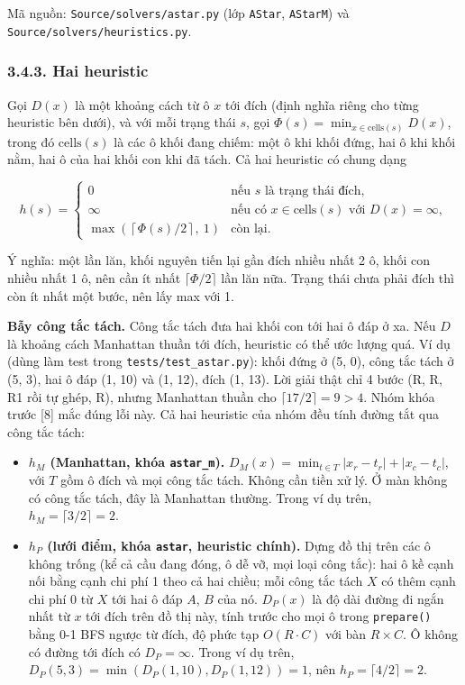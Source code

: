 Mã nguồn: \texttt{Source/\allowbreak{}solvers/\allowbreak{}astar.\allowbreak{}py} (lớp \texttt{AStar}, \texttt{AStarM}) và \texttt{Source/\allowbreak{}solvers/\allowbreak{}heuristics.\allowbreak{}py}.

\subsubsection{3.4.3. Hai heuristic}

Gọi \(D(x)\) là một khoảng cách từ ô \(x\) tới đích (định nghĩa riêng cho từng heuristic bên dưới), và với mỗi trạng thái \(s\), gọi \(\Phi(s) = \min_{x \in \text{cells}(s)} D(x)\), trong đó \(\text{cells}(s)\) là các ô khối đang chiếm: một ô khi khối đứng, hai ô khi khối nằm, hai ô của hai khối con khi đã tách. Cả hai heuristic có chung dạng

\[
h(s) = \begin{cases}
0 & \text{nếu } s \text{ là trạng thái đích,} \\
\infty & \text{nếu có } x \in \text{cells}(s) \text{ với } D(x) = \infty, \\
\max\left(\left\lceil \Phi(s)/2 \right\rceil,\ 1\right) & \text{còn lại.}
\end{cases}
\]

Ý nghĩa: một lần lăn, khối nguyên tiến lại gần đích nhiều nhất 2 ô, khối con nhiều nhất 1 ô, nên cần ít nhất \(\lceil \Phi/2 \rceil\) lần lăn nữa. Trạng thái chưa phải đích thì còn ít nhất một bước, nên lấy max với 1.

\textbf{Bẫy công tắc tách.} Công tắc tách đưa hai khối con tới hai ô đáp ở xa. Nếu \(D\) là khoảng cách Manhattan thuần tới đích, heuristic có thể ước lượng quá. Ví dụ (dùng làm test trong \texttt{tests/\allowbreak{}test\_\allowbreak{}astar.\allowbreak{}py}): khối đứng ở (5, 0), công tắc tách ở (5, 3), hai ô đáp (1, 10) và (1, 12), đích (1, 13). Lời giải thật chỉ 4 bước (R, R, R1 rồi tự ghép, R), nhưng Manhattan thuần cho \(\lceil 17/2 \rceil = 9 > 4\). Nhóm khóa trước {[}8{]} mắc đúng lỗi này. Cả hai heuristic của nhóm đều tính đường tắt qua công tắc tách:

\begin{itemize}
\tightlist
\item
  \textbf{\(h_M\) (Manhattan, khóa \texttt{astar\_\allowbreak{}m}).} \(D_M(x) = \min_{t \in T} |x_r - t_r| + |x_c - t_c|\), với \(T\) gồm ô đích và mọi công tắc tách. Không cần tiền xử lý. Ở màn không có công tắc tách, đây là Manhattan thường. Trong ví dụ trên, \(h_M = \lceil 3/2 \rceil = 2\).
\item
  \textbf{\(h_P\) (lưới điểm, khóa \texttt{astar}, heuristic chính).} Dựng đồ thị trên các ô không trống (kể cả cầu đang đóng, ô dễ vỡ, mọi loại công tắc): hai ô kề cạnh nối bằng cạnh chi phí 1 theo cả hai chiều; mỗi công tắc tách \(X\) có thêm cạnh chi phí 0 từ \(X\) tới hai ô đáp \(A\), \(B\) của nó. \(D_P(x)\) là độ dài đường đi ngắn nhất từ \(x\) tới đích trên đồ thị này, tính trước cho mọi ô trong \texttt{prepare()} bằng 0-1 BFS ngược từ đích, độ phức tạp \(O(R \cdot C)\) với bàn \(R \times C\). Ô không có đường tới đích có \(D_P = \infty\). Trong ví dụ trên, \(D_P(5, 3) = \min(D_P(1, 10), D_P(1, 12)) = 1\), nên \(h_P = \lceil 4/2 \rceil = 2\).
\end{itemize}

